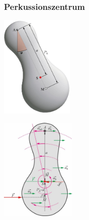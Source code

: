 \subsubsection{Perkussionszentrum}
\begin{center}
	\begin{minipage}{0.3\textwidth}
		\includegraphics[height=5cm,keepaspectratio=true]{Images/schwerependel_perkussionszentrum.png}
	\end{minipage}%
	\begin{minipage}{0.3\textwidth}
		\includegraphics[height=5cm,keepaspectratio=true]{Images/perkussionszentrum.png}
	\end{minipage}
\end{center}




